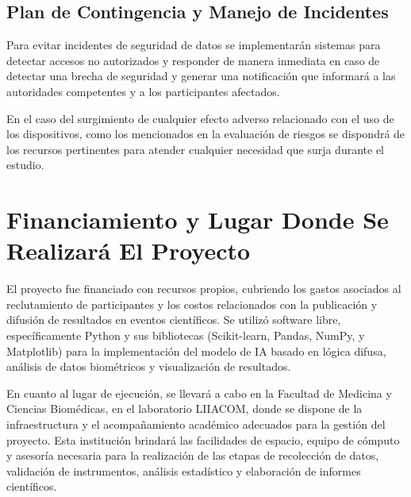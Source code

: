 \subsection{Plan de Contingencia y Manejo de Incidentes}
\label{subsec:plan_contingencia}

Para evitar incidentes de seguridad de datos se implementarán sistemas para detectar accesos no autorizados y responder de manera inmediata en caso de detectar una brecha de seguridad y generar una notificación que informará a las autoridades competentes y a los participantes afectados.

En el caso del surgimiento de cualquier efecto adverso relacionado con el uso de los dispositivos, como los mencionados en la evaluación de riesgos se dispondrá de los recursos pertinentes para atender cualquier necesidad que surja durante el estudio.

\section{Financiamiento y Lugar Donde Se Realizará El Proyecto}
\label{sec:financiamiento_lugar}

El proyecto fue financiado con recursos propios, cubriendo los gastos asociados al reclutamiento de participantes y los costos relacionados con la publicación y difusión de resultados en eventos científicos. Se utilizó software libre, específicamente Python y sus bibliotecas (Scikit-learn, Pandas, NumPy, y Matplotlib) para la implementación del modelo de IA basado en lógica difusa, análisis de datos biométricos y visualización de resultados.

En cuanto al lugar de ejecución, se llevará a cabo en la Facultad de Medicina y Ciencias Biomédicas, en el laboratorio LIIACOM, donde se dispone de la infraestructura y el acompañamiento académico adecuados para la gestión del proyecto. Esta institución brindará las facilidades de espacio, equipo de cómputo y asesoría necesaria para la realización de las etapas de recolección de datos, validación de instrumentos, análisis estadístico y elaboración de informes científicos.
